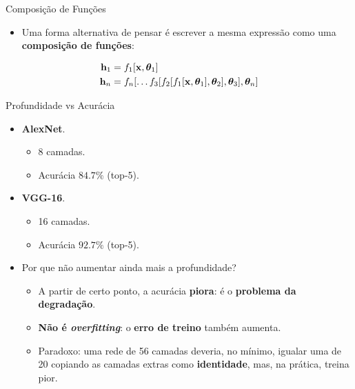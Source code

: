 \documentclass[aspectratio=169,xcolor=dvipsnames]{beamer}
\begin{document}
\begin{frame}{Composição de Funções}
\begin{itemize}
    \item Uma forma alternativa de pensar é escrever a mesma expressão como uma \textbf{composição de funções}:
\end{itemize}
\begin{align*}
    \mathbf{h}_1 &= f_1[\mathbf{x},\bm{\theta}_1] \\
    \mathbf{h}_n &= f_n[\dots f_3[f_2[f_1[\mathbf{x},\bm{\theta}_1],\bm{\theta}_2],\bm{\theta}_3],\bm{\theta}_n]
\end{align*}
\vspace{0.5em}
\begin{center}
\end{center}
\end{frame}

\begin{frame}{Profundidade vs Acurácia}
\begin{itemize}
    \item \textbf{AlexNet}.
    \begin{itemize}
        \item 8 camadas.
        \item Acurácia $84.7\%$ (top-5).
    \end{itemize}
    \item \textbf{VGG-16}.
    \begin{itemize}
        \item 16 camadas.
        \item Acurácia $92.7\%$ (top-5).
    \end{itemize}
    \item Por que não aumentar ainda mais a profundidade?
    \begin{itemize}
        \item A partir de certo ponto, a acurácia \textbf{piora}: é o \textbf{problema da degradação}.
        \item \textbf{Não é \textit{overfitting}}: o \textbf{erro de treino} também aumenta.
        \item Paradoxo: uma rede de 56 camadas deveria, no mínimo, igualar uma de 20 copiando as camadas extras como \textbf{identidade}, mas, na prática, treina pior.
    \end{itemize}
\end{itemize}
\end{frame}
\end{document}
